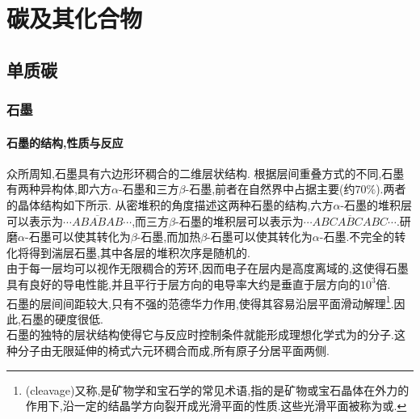\documentclass{ctexart}
\begin{document}
\section{碳及其化合物}
\subsection{单质碳}
\subsubsection{石墨}
\paragraph{石墨的结构,性质与反应}
众所周知,石墨具有六边形环稠合的二维层状结构.
根据层间重叠方式的不同,石墨有两种异构体,即六方$\alpha$-石墨和三方$\beta$-石墨,前者在自然界中占据主要(约$70\%$).两者的晶体结构如下所示.
从密堆积的角度描述这两种石墨的结构,六方$\alpha$-石墨的堆积层可以表示为$\cdots AB\overline{AB}AB\cdots$,而三方$\beta$-石墨的堆积层可以表示为$\cdots ABC\overline{ABC}ABC\cdots$.研磨$\alpha$-石墨可以使其转化为$\beta$-石墨,而加热$\beta$-石墨可以使其转化为$\alpha$-石墨.不完全的转化将得到湍层石墨,其中各层的堆积次序是随机的.\\
\indent 由于每一层均可以视作无限稠合的芳环,因而电子在层内是高度离域的,这使得石墨具有良好的导电性能,并且平行于层方向的电导率大约是垂直于层方向的$10^3$倍.\\
\indent 石墨的层间间距较大,只有不强的范德华力作用,使得其容易沿层平面滑动解理\footnote{(cleavage)又称,是矿物学和宝石学的常见术语,指的是矿物或宝石晶体在外力的作用下,沿一定的结晶学方向裂开成光滑平面的性质.这些光滑平面被称为或.}.因此,石墨的硬度很低.\\
\indent 石墨的独特的层状结构使得它与反应时控制条件就能形成理想化学式为的分子.这种分子由无限延伸的椅式六元环稠合而成,所有原子分居平面两侧.
\end{document}
